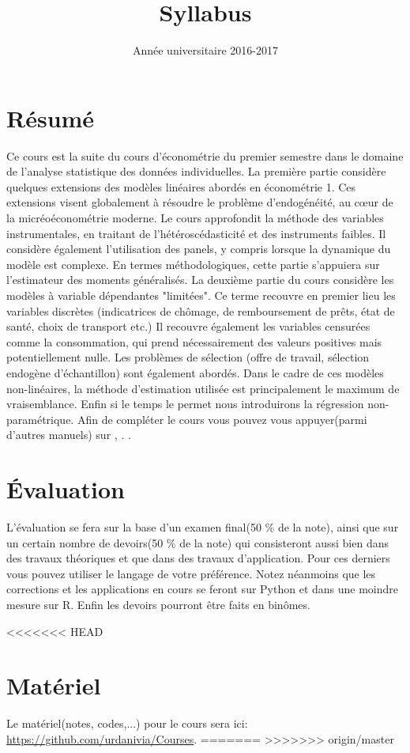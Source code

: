 \documentclass[12pt, reqno]{amsart}
\title{Syllabus}
\date{Année universitaire 2016-2017}
\begin{document}
\maketitle
\section{Résumé}
Ce cours est la suite du cours d'économétrie du premier semestre dans le domaine de l'analyse statistique des données individuelles. La première partie considère quelques extensions des modèles linéaires abordés en économétrie 1. Ces extensions visent globalement à résoudre le problème d'endogénéité, au cœur de la micréoéconométrie moderne. Le cours approfondit la méthode des variables instrumentales, en traitant de l'hétéroscédasticité et des instruments faibles. Il considère également  l'utilisation des panels, y compris lorsque la dynamique du modèle est complexe. En termes méthodologiques, cette partie s'appuiera sur l'estimateur des moments généralisés. La deuxième partie du cours considère les modèles à variable dépendantes "limitées". Ce terme recouvre en premier lieu les variables discrètes (indicatrices de chômage, de remboursement de prêts, état de santé, choix de transport etc.) Il recouvre également les variables censurées comme la consommation, qui prend nécessairement des valeurs positives mais potentiellement nulle. Les problèmes de sélection (offre de travail, sélection endogène d'échantillon) sont également abordés. Dans le cadre de ces modèles non-linéaires, la méthode d'estimation utilisée est principalement le maximum de vraisemblance. Enfin si le temps le permet nous introduirons la régression non-paramétrique. Afin de compléter le cours vous pouvez vous appuyer(parmi d'autres manuels)  sur \cite{Wooldridge2010},  \cite{Amemiya1985}. \cite{White1980}.

\section{\'Evaluation}
L'évaluation se fera sur la base d'un examen final(50 $\%$ de la note), ainsi que sur un certain nombre de devoirs(50 $\%$ de la note) qui consisteront aussi bien dans des travaux théoriques et que dans des travaux d'application. Pour ces derniers vous pouvez utiliser le langage de votre préférence. Notez néanmoins que les corrections et les applications en cours se feront sur Python et dans une moindre mesure sur R. Enfin les devoirs pourront être faits en binômes.

<<<<<<< HEAD
\section*{Matériel}
Le matériel(notes, codes,...) pour le cours sera ici:  \url{https://github.com/urdanivia/Courses}.
=======
>>>>>>> origin/master
\end{document}
